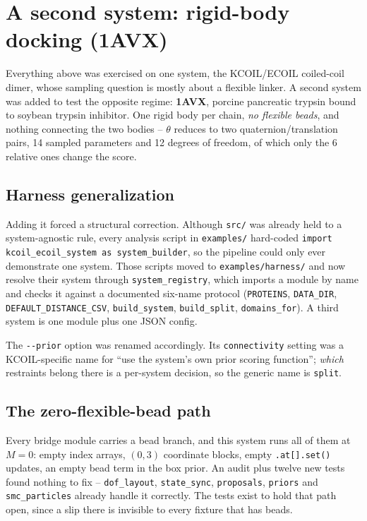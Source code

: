 \documentclass[11pt]{article}
\begin{document}
\section{A second system: rigid-body docking (1AVX)}
\label{sec:docking}

Everything above was exercised on one system, the KCOIL/ECOIL coiled-coil
dimer, whose sampling question is mostly about a flexible linker. A second
system was added to test the opposite regime: \textbf{1AVX}, porcine
pancreatic trypsin bound to soybean trypsin inhibitor. One rigid body per
chain, \emph{no flexible beads}, and nothing connecting the two bodies --
$\theta$ reduces to two quaternion/translation pairs, 14 sampled parameters
and 12 degrees of freedom, of which only the 6 relative ones change the
score.

\subsection{Harness generalization}

Adding it forced a structural correction. Although \texttt{src/} was already
held to a system-agnostic rule, every analysis script in \texttt{examples/}
hard-coded \texttt{import kcoil\_ecoil\_system as system\_builder}, so the
pipeline could only ever demonstrate one system. Those scripts moved to
\texttt{examples/harness/} and now resolve their system through
\texttt{system\_registry}, which imports a module by name and checks it
against a documented six-name protocol (\texttt{PROTEINS},
\texttt{DATA\_DIR}, \texttt{DEFAULT\_DISTANCE\_CSV}, \texttt{build\_system},
\texttt{build\_split}, \texttt{domains\_for}). A third system is one module
plus one JSON config.

The \texttt{-{}-prior} option was renamed accordingly. Its
\texttt{connectivity} setting was a KCOIL-specific name for ``use the
system's own prior scoring function''; \emph{which} restraints belong there
is a per-system decision, so the generic name is \texttt{split}.

\subsection{The zero-flexible-bead path}

Every bridge module carries a bead branch, and this system runs all of them
at $M = 0$: empty index arrays, $(0,3)$ coordinate blocks, empty
\texttt{.at[].set()} updates, an empty bead term in the box prior. An audit
plus twelve new tests found nothing to fix -- \texttt{dof\_layout},
\texttt{state\_sync}, \texttt{proposals}, \texttt{priors} and
\texttt{smc\_particles} already handle it correctly. The tests exist to hold
that path open, since a slip there is invisible to every fixture that has
beads.
\end{document}
